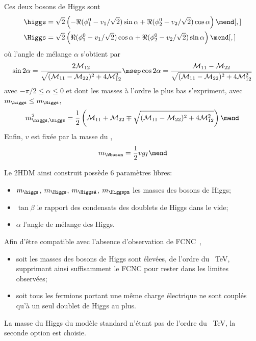 Ces deux bosons de Higgs sont
\begin{align}
\higgs &= \sqrt{2}\left(-\Re(\phi_1^0-v_1/\sqrt{2})\sin\alpha+\Re(\phi_2^0-v_2/\sqrt{2})\cos\alpha\right)
\mend[,]
\\
\Higgs &= \sqrt{2}\left(\Re(\phi_1^0-v_1/\sqrt{2})\cos\alpha+\Re(\phi_2^0-v_2/\sqrt{2})\sin\alpha\right)
\mend[,]
\end{align}
où l'angle de mélange $\alpha$ s'obtient par
\begin{equation}
\sin 2\alpha = \frac{2\mathcal{M}_{12}}{\sqrt{(\mathcal{M}_{11}-\mathcal{M}_{22})^2+4\mathcal{M}_{12}^2}}
\msep
\cos 2\alpha = \frac{\mathcal{M}_{11}-\mathcal{M}_{22}}{\sqrt{(\mathcal{M}_{11}-\mathcal{M}_{22})^2+4\mathcal{M}_{12}^2}}
\end{equation}
avec $-\pi/2\leq\alpha\leq0$
et
dont les masses à l'ordre le plus bas s'expriment, avec $m_{\higgs} \leq m_{\Higgs}$,
\begin{equation}
m_{\higgs,\Higgs}^2 = \frac{1}{2} \left( \mathcal{M}_{11} + \mathcal{M}_{22} \mp \sqrt{(\mathcal{M}_{11}-\mathcal{M}_{22})^2+4\mathcal{M}_{12}^2} \right)
\mend
\end{equation}
Enfin, $v$ est fixée par la masse du \Wboson,
\begin{equation}
m_{\Wboson} = \frac{1}{2}vg_I
\label{eq-2HDM_W_mass}
\mend
\end{equation}
\par Le 2HDM ainsi construit possède 6 paramètres libres:
\begin{itemize}
\item $m_{\higgs}$, $m_{\Higgs}$, $m_{\HiggsA}$, $m_{\Higgspm}$ les masses des bosons de Higgs;
\item $\tan\beta$ le rapport des condensats des doublets de Higgs dans le vide;
\item $\alpha$ l'angle de mélange des Higgs.
\end{itemize}
\par Afin d'être compatible avec l'absence d'observation de FCNC~\cite{Higgs_hunter_guide},
\begin{itemize}
\item soit les masses des bosons de Higgs sont élevées, de l'ordre du \SI{}{\TeV}, supprimant ainsi suffisamment le FCNC pour rester dans les limites observées;
\item soit tous les fermions portant une même charge électrique ne sont couplés qu'à un seul doublet de Higgs au plus.
\end{itemize}
La masse du Higgs du modèle standard n'étant pas de l'ordre du \SI{}{\TeV}, la seconde option est choisie.
